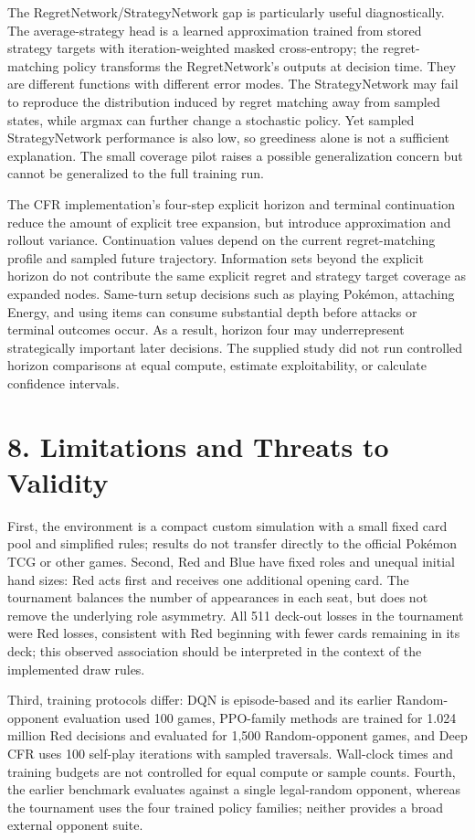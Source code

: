 \documentclass[11pt]{article}
\begin{document}
The RegretNetwork/StrategyNetwork gap is particularly useful diagnostically. The average-strategy head is a learned approximation trained from stored strategy targets with iteration-weighted masked cross-entropy; the regret-matching policy transforms the RegretNetwork's outputs at decision time. They are different functions with different error modes. The StrategyNetwork may fail to reproduce the distribution induced by regret matching away from sampled states, while argmax can further change a stochastic policy. Yet sampled StrategyNetwork performance is also low, so greediness alone is not a sufficient explanation. The small coverage pilot raises a possible generalization concern but cannot be generalized to the full training run.

The CFR implementation's four-step explicit horizon and terminal continuation reduce the amount of explicit tree expansion, but introduce approximation and rollout variance. Continuation values depend on the current regret-matching profile and sampled future trajectory. Information sets beyond the explicit horizon do not contribute the same explicit regret and strategy target coverage as expanded nodes. Same-turn setup decisions such as playing Pok\'emon, attaching Energy, and using items can consume substantial depth before attacks or terminal outcomes occur. As a result, horizon four may underrepresent strategically important later decisions. The supplied study did not run controlled horizon comparisons at equal compute, estimate exploitability, or calculate confidence intervals.

\section*{8. Limitations and Threats to Validity}

First, the environment is a compact custom simulation with a small fixed card pool and simplified rules; results do not transfer directly to the official Pok\'emon TCG or other games. Second, Red and Blue have fixed roles and unequal initial hand sizes: Red acts first and receives one additional opening card. The tournament balances the number of appearances in each seat, but does not remove the underlying role asymmetry. All 511 deck-out losses in the tournament were Red losses, consistent with Red beginning with fewer cards remaining in its deck; this observed association should be interpreted in the context of the implemented draw rules.

Third, training protocols differ: DQN is episode-based and its earlier Random-opponent evaluation used 100 games, PPO-family methods are trained for 1.024 million Red decisions and evaluated for 1,500 Random-opponent games, and Deep CFR uses 100 self-play iterations with sampled traversals. Wall-clock times and training budgets are not controlled for equal compute or sample counts. Fourth, the earlier benchmark evaluates against a single legal-random opponent, whereas the tournament uses the four trained policy families; neither provides a broad external opponent suite.
\end{document}

